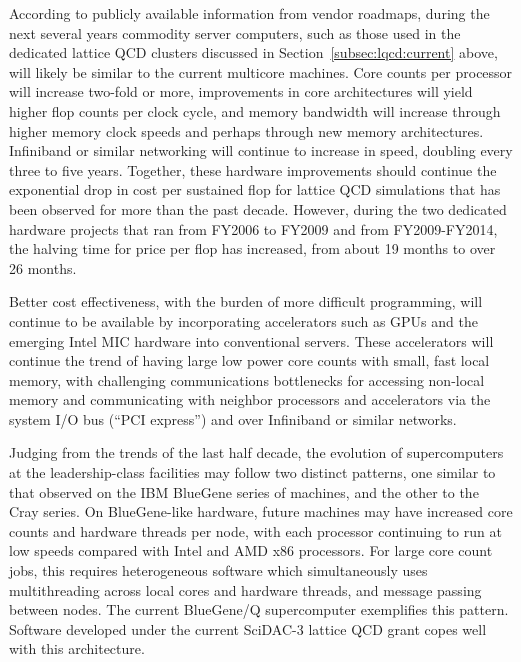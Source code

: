 According to publicly available information from vendor roadmaps, during the
next several years commodity server computers, such as those used in the
dedicated lattice QCD clusters discussed in Section~\ref{subsec:lqcd:current}
above, will likely be similar to the current multicore machines.  Core counts
per processor will increase two-fold or more, improvements in core
architectures will yield higher flop counts per clock cycle, and memory
bandwidth will increase through higher memory clock speeds and perhaps through
new memory architectures.  Infiniband or similar networking will continue to
increase in speed, doubling every three to five years.  Together, these
hardware improvements should continue the exponential drop in cost per
sustained flop for lattice QCD simulations that has been observed for more
than the past decade.  However, during the two dedicated hardware projects
that ran from FY2006 to FY2009 and from FY2009-FY2014, the halving time for
price per flop has increased, from about 19 months to over 26 months.

Better cost effectiveness, with the burden of more difficult programming, will
continue to be available by incorporating accelerators such as GPUs and the
emerging Intel MIC hardware into conventional servers.  These accelerators
will continue the trend of having large low power core counts with small, fast
local memory, with challenging communications bottlenecks for accessing
non-local memory and communicating with neighbor processors and accelerators
via the system I/O bus (``PCI express'') and over Infiniband or similar
networks.  
 
Judging from the trends of the last half decade, the evolution of
supercomputers at the leadership-class facilities may follow two distinct
patterns, one similar to that observed on the IBM BlueGene series of machines,
and the other to the Cray series.  On BlueGene-like hardware, future machines
may have increased core counts and hardware threads per node, with each
processor continuing to run at low speeds compared with Intel and AMD x86
processors.  For large core count jobs, this requires heterogeneous software
which simultaneously uses multithreading across local cores and hardware
threads, and message passing between nodes.    The current BlueGene/Q
supercomputer exemplifies this pattern.  Software developed under the
current SciDAC-3 lattice QCD grant copes well with this architecture.

